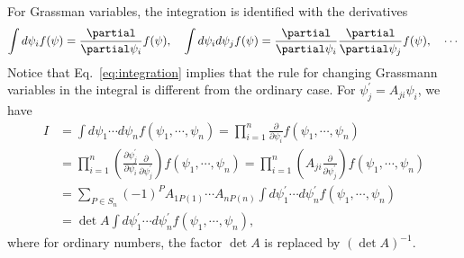 For Grassman variables, the integration is identified with the derivatives
\begin{equation}\label{eq:integration}
	\int d\psi_i f(\p) = \frac{\partial}{\partial \psi_i} f(\p), \quad
	\int d\psi_i d\p_j f(\p) = \frac{\partial}{\partial \psi_i} \frac{\partial}{\partial \psi_j}f(\p),\quad \cdots
\end{equation}
Notice that Eq.~\eqref{eq:integration} implies that the rule for changing Grassmann variables in the integral is different from the ordinary case. 
For $\psi_j^\prime = A_{ji}\psi_i$, we have
\begin{equation}
    \begin{aligned}
    I &= \int d\psi_1\cdots d\psi_n f(\psi_1,\cdots,\psi_n) = \prod_{i=1}^n \frac{\partial}{\partial \psi_i} f(\psi_1,\cdots,\psi_n)\\
    &= \prod_{i=1}^n (\frac{\partial \psi^\prime_j}{\partial \psi_i}\frac{\partial}{\partial \psi_j^\prime} )f(\psi_1,\cdots,\psi_n)
    = \prod_{i=1}^n (A_{ji}\frac{\partial}{\partial \psi_j^\prime}) f(\psi_1,\cdots,\psi_n) \\
	&= \sum_{P\in S_n} (-1)^P A_{1 P(1)}\cdots A_{n P(n)} \int d\psi^\prime_1\cdots d\psi^\prime_n f(\psi_1,\cdots,\psi_n)\\
	&= \operatorname{det}A \int d\psi^\prime_1\cdots d\psi^\prime_n f(\psi_1,\cdots,\psi_n),
    \end{aligned}
\end{equation}
where for ordinary numbers, the factor $\operatorname{det} A$ is replaced by $(\operatorname{det} A)^{-1}$.

